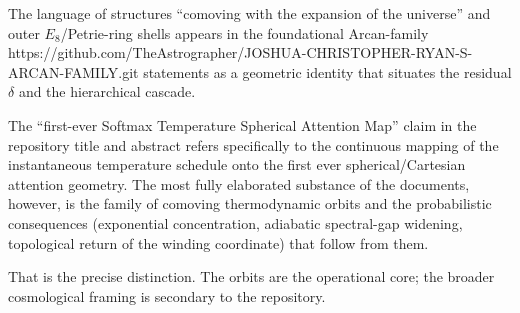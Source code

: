 The language of structures “comoving with the expansion of the universe” and outer \(E_8\)/Petrie-ring shells appears in the foundational Arcan-family https://github.com/TheAstrographer/JOSHUA-CHRISTOPHER-RYAN-S-ARCAN-FAMILY.git statements as a geometric identity that situates the residual \(\delta\) and the hierarchical cascade.

The “first-ever Softmax Temperature Spherical Attention Map” claim in the repository title and abstract refers specifically to the continuous mapping of the instantaneous temperature schedule onto the first ever spherical/Cartesian attention geometry. The most fully elaborated substance of the documents, however, is the family of comoving thermodynamic orbits and the probabilistic consequences (exponential concentration, adiabatic spectral-gap widening, topological return of the winding coordinate) that follow from them.

That is the precise distinction. The orbits are the operational core; the broader cosmological framing is secondary to the repository.
